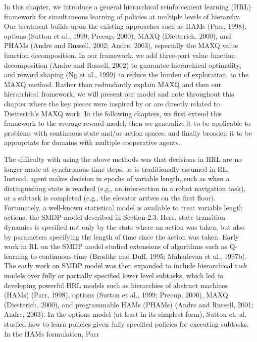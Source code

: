 In this chapter, we introduce a general hierarchical reinforcement learning (HRL) framework
for simultaneous learning of policies at multiple levels of hierarchy. Our treatment
builds upon the existing approaches such as HAMs (Parr, 1998), options (Sutton et al.,
1999; Precup, 2000), MAXQ (Dietterich, 2000), and PHAMs (Andre and Russell, 2002;
Andre, 2003), especially the MAXQ value function decomposition. In our framework,
we add three-part value function decomposition (Andre and Russell, 2002) to guarantee
hierarchical optimality, and reward shaping (Ng et al., 1999) to reduce the burden of exploration,
to the MAXQ method. Rather than redundantly explain MAXQ and then our
hierarchical framework, we will present our model and note throughout this chapter where
the key pieces were inspired by or are directly related to Dietterich’s MAXQ work. In the
following chapters, we first extend this framework to the average reward model, then we
generalize it to be applicable to problems with continuous state and/or action spaces, and
finally broaden it to be appropriate for domains with multiple cooperative agents.

The difficulty with using the above methods was that decisions in HRL are no longer
made at synchronous time steps, as is traditionally assumed in RL. Instead, agent makes decision
in epochs of variable length, such as when a distinguishing state is reached (e.g., an
intersection in a robot navigation task), or a subtask is completed (e.g., the elevator arrives
on the first floor). Fortunately, a well-known statistical model is available to treat variable
length actions: the SMDP model described in Section 2.3. Here, state transition dynamics
is specified not only by the state where an action was taken, but also by parameters
specifying the length of time since the action was taken. Early work in RL on the SMDP
model studied extensions of algorithms such as Q-learning to continuous-time (Bradtke and
Duff, 1995; Mahadevan et al., 1997b). The early work on SMDP model was then expanded
to include hierarchical task models over fully or partially specified lower level subtasks,
which led to developing powerful HRL models such as hierarchies of abstract machines
(HAMs) (Parr, 1998), options (Sutton et al., 1999; Precup, 2000), MAXQ (Dietterich,
2000), and programmable HAMs (PHAMs) (Andre and Russell, 2001; Andre, 2003). In
the options model (at least in its simplest form), Sutton et. al. studied how to learn policies
given fully specified policies for executing subtasks. In the HAMs formulation, Parr

